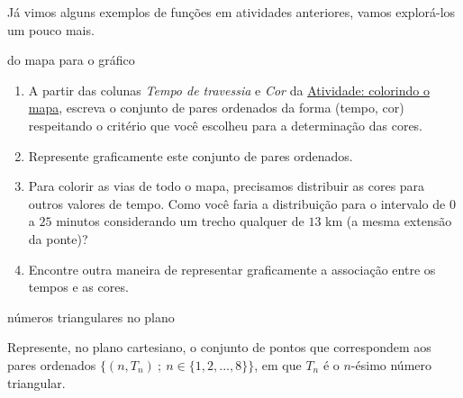 Já vimos alguns exemplos de funções em atividades anteriores, vamos explorá-los um pouco mais.


\begin{task}{ do mapa para o gráfico}
\label{\detokenize{AF106-4:ativ-funcoes-do-mapa-para-grafico}}\label{\detokenize{AF106-4:atividade-do-mapa-para-o-grafico}}

\begin{enumerate}
\item {} 
A partir das colunas \emph{Tempo de travessia} e \emph{Cor} da {\hyperref[\detokenize{AF106-2:ativ-funcoes-colorindo-o-mapa}]{Atividade: colorindo o mapa}}, escreva o conjunto de pares ordenados da forma (tempo, cor) respeitando o critério que você escolheu para a determinação das cores.

\item {} 
Represente graficamente este conjunto de pares ordenados.

\item {} 
Para colorir as vias de todo o mapa, precisamos distribuir as cores para outros valores de tempo. Como você faria a distribuição para o intervalo de \(0\) a \(25\) minutos considerando um trecho qualquer de \(13\) km (a mesma extensão da ponte)?

\item {} 
Encontre outra maneira de representar graficamente a associação entre os tempos e as cores.

\end{enumerate}

\end{task}

\begin{task}{ números triangulares no plano}
\label{\detokenize{AF106-4:atividade-numeros-triangulares-no-plano}}\label{\detokenize{AF106-4:ativ-funcoes-numeros-triangulares}}

Represente, no plano cartesiano, o conjunto de pontos que correspondem aos pares ordenados \(\{(n,T_n)\ ;\ n\in\{1,2,...,8\}\}\), em que \(T_n\) é o \(n\)-ésimo número triangular.

\end{task}


